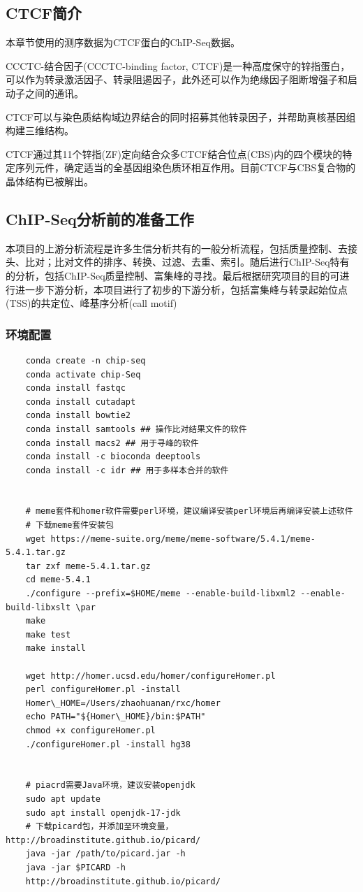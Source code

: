 \subsection{CTCF简介}
本章节使用的测序数据为CTCF蛋白的ChIP-Seq数据。\par
CCCTC-结合因子(CCCTC-binding factor, CTCF)是一种高度保守的锌指蛋白，可以作为转录激活因子、转录阻遏因子，此外还可以作为绝缘因子阻断增强子和启动子之间的通讯。\par
CTCF可以与染色质结构域边界结合的同时招募其他转录因子，并帮助真核基因组构建三维结构。\par
CTCF通过其11个锌指(ZF)定向结合众多CTCF结合位点(CBS)内的四个模块的特定序列元件，确定适当的全基因组染色质环相互作用。目前CTCF与CBS复合物的晶体结构已被解出。

\subsection{ChIP-Seq分析前的准备工作}
本项目的上游分析流程是许多生信分析共有的一般分析流程，包括质量控制、去接头、比对；比对文件的排序、转换、过滤、去重、索引。随后进行ChIP-Seq特有的分析，包括ChIP-Seq质量控制、富集峰的寻找。最后根据研究项目的目的可进行进一步下游分析，本项目进行了初步的下游分析，包括富集峰与转录起始位点(TSS)的共定位、峰基序分析(call motif)
\subsubsection{环境配置}

\begin{lstlisting}
    conda create -n chip-seq
    conda activate chip-Seq
    conda install fastqc 
    conda install cutadapt 
    conda install bowtie2 
    conda install samtools ## 操作比对结果文件的软件
    conda install macs2 ## 用于寻峰的软件
    conda install -c bioconda deeptools
    conda install -c idr ## 用于多样本合并的软件


    # meme套件和homer软件需要perl环境，建议编译安装perl环境后再编译安装上述软件
    # 下载meme套件安装包
    wget https://meme-suite.org/meme/meme-software/5.4.1/meme-5.4.1.tar.gz
    tar zxf meme-5.4.1.tar.gz
    cd meme-5.4.1
    ./configure --prefix=$HOME/meme --enable-build-libxml2 --enable-build-libxslt \par
    make
    make test
    make install

    wget http://homer.ucsd.edu/homer/configureHomer.pl
    perl configureHomer.pl -install
    Homer\_HOME=/Users/zhaohuanan/rxc/homer
    echo PATH="${Homer\_HOME}/bin:$PATH"
    chmod +x configureHomer.pl
    ./configureHomer.pl -install hg38


    # piacrd需要Java环境，建议安装openjdk
    sudo apt update 
    sudo apt install openjdk-17-jdk
    # 下载picard包，并添加至环境变量，http://broadinstitute.github.io/picard/
    java -jar /path/to/picard.jar -h 
    java -jar $PICARD -h 
    http://broadinstitute.github.io/picard/
\end{lstlisting}

